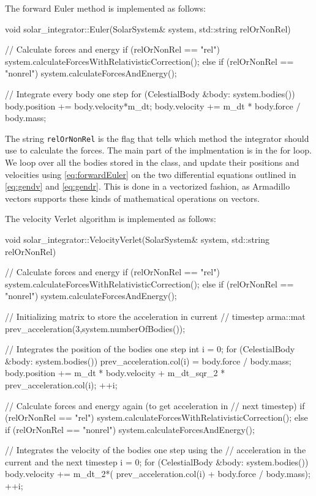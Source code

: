 \documentclass[reprint,english,notitlepage]{revtex4-1}  %
\begin{document}
The forward Euler method is implemented as follows:
\begin{cpp}
void solar_integrator::Euler(SolarSystem& system, 
							 std::string relOrNonRel) {
  // Calculate forces and energy
  if (relOrNonRel == "rel") {
    system.calculateForcesWithRelativisticCorrection();
  } else if (relOrNonRel == "nonrel") {
    system.calculateForcesAndEnergy();
  }

  // Integrate every body one step
  for (CelestialBody &body: system.bodies()) {
    body.position += body.velocity*m_dt;
    body.velocity += m_dt * body.force / body.mass;
  }
}
\end{cpp} 

The string \verb+relOrNonRel+ is the flag that tells which method the integrator should use to calculate the forces.    The main part of the implmentation is in the for loop. We loop over all the bodies stored in the class, and update their positions and velocities using \eqref{eq:forwardEuler} on the two differential equations outlined in \eqref{eq:gendv} and \eqref{eq:gendr}. This is done in a vectorized fashion, as Armadillo \citep{Armadillo} vectors supports these kinds of mathematical operations on vectors.

The velocity Verlet algorithm is implemented as follows:

\begin{cpp}
void solar_integrator::VelocityVerlet(SolarSystem& system,
									  std::string relOrNonRel) {
  // Calculate forces and energy
  if (relOrNonRel == "rel") {
    system.calculateForcesWithRelativisticCorrection();
  } else if (relOrNonRel == "nonrel") {
    system.calculateForcesAndEnergy();
  }

  // Initializing matrix to store the acceleration in current 
  // timestep
  arma::mat prev_acceleration(3,system.numberOfBodies());

  // Integrates the position of the bodies one step
  int i = 0;
  for (CelestialBody &body: system.bodies()) {
    prev_acceleration.col(i) = body.force / body.mass;
    body.position += m_dt * body.velocity 
    				 + m_dt_sqr_2 * prev_acceleration.col(i);
    ++i;
  }

  // Calculate forces and energy again (to get acceleration in 
  // next timestep)
  if (relOrNonRel == "rel") {
    system.calculateForcesWithRelativisticCorrection();
  } else if (relOrNonRel == "nonrel") {
    system.calculateForcesAndEnergy();
  }

  // Integrates the velocity of the bodies one step using the 
  // acceleration in the current and the next timestep
  i = 0;
  for (CelestialBody &body: system.bodies()) {
    body.velocity += m_dt_2*( prev_acceleration.col(i) 
    				 + body.force / body.mass);
    ++i;
  }
}
\end{cpp}
\end{document}
